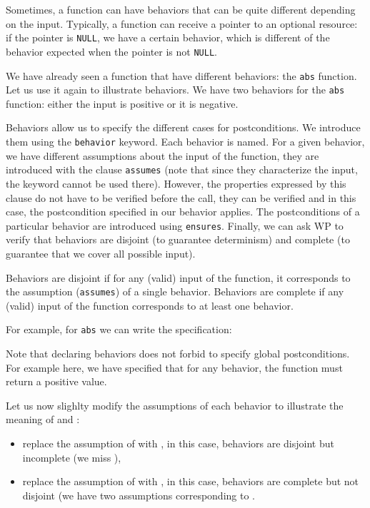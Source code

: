 Sometimes, a function can have behaviors that can be quite different
depending on the input. Typically, a function can receive a pointer to
an optional resource: if the pointer is \texttt{NULL}, we have a
certain behavior, which is different of the behavior expected when
the pointer is not \texttt{NULL}.

We have already seen a function that have different behaviors: the
\texttt{abs} function. Let us use it again to illustrate behaviors. We
have two behaviors for the \texttt{abs} function: either the input is
positive or it is negative.

Behaviors allow us to specify the different cases for postconditions. We
introduce them using the \texttt{behavior} keyword. Each behavior
is named. For a given behavior, we have different assumptions about the
input of the function, they are introduced with the clause
\texttt{assumes} (note that since they characterize the input, the
keyword  cannot be used there). However,
the properties expressed by this clause do not have to be verified before
the call, they can be verified and in this case, the postcondition
specified in our behavior applies. The postconditions of a particular
behavior are introduced using \texttt{ensures}. Finally, we can ask WP to
verify that behaviors are disjoint (to guarantee determinism) and
complete (to guarantee that we cover all possible input).

Behaviors are disjoint if for any (valid) input of the function, it
corresponds to the assumption (\texttt{assumes}) of a single behavior.
Behaviors are complete if any (valid) input of the function corresponds
to at least one behavior.

For example, for \texttt{abs} we can write the specification:






Note that declaring behaviors does not forbid to specify global postconditions.
For example here, we have specified that for any behavior, the function must
return a positive value.



Let us now slighlty modify the assumptions of each behavior to illustrate
the meaning of  and :

\begin{itemize}
\item
  replace the assumption of  with
  , in this case, behaviors are
  disjoint but incomplete (we miss ),
\item
  replace the assumption of  with
  , in this case, behaviors are
  complete but not disjoint (we have two assumptions corresponding
  to .
\end{itemize}


